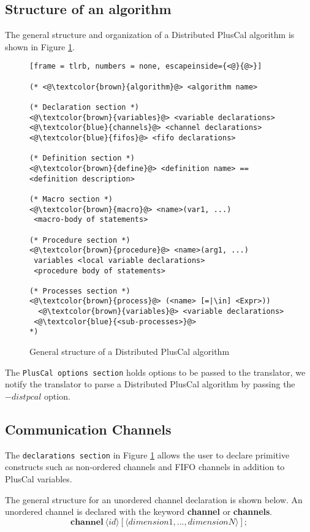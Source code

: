 \documentclass[journal]{IEEEtran}
\newcommand{\keyword}[1]{\textbf{#1}}
\newcommand{\entity}[1]{\ensuremath{\langle}#1\ensuremath{\rangle}}
\begin{document}
\subsection{Structure of an algorithm}

The general structure and organization of a Distributed PlusCal algorithm is shown in Figure \ref{dpluscal-struct}.

\begin{figure}
\begin{lstlisting}[frame = tlrb, numbers = none, escapeinside={<@}{@>}]

(* <@\textcolor{brown}{algorithm}@> <algorithm name>

(* Declaration section *)
<@\textcolor{brown}{variables}@> <variable declarations>
<@\textcolor{blue}{channels}@> <channel declarations>
<@\textcolor{blue}{fifos}@> <fifo declarations>

(* Definition section *)
<@\textcolor{brown}{define}@> <definition name> == <definition description>

(* Macro section *)
<@\textcolor{brown}{macro}@> <name>(var1, ...)
 <macro-body of statements>

(* Procedure section *)
<@\textcolor{brown}{procedure}@> <name>(arg1, ...)
 variables <local variable declarations>
 <procedure body of statements>

(* Processes section *)
<@\textcolor{brown}{process}@> (<name> [=|\in] <Expr>))
  <@\textcolor{brown}{variables}@> <variable declarations>
 <@\textcolor{blue}{<sub-processes>}@>
*)
\end{lstlisting}

\caption{General structure of a Distributed PlusCal algorithm}
\label{dpluscal-struct}
\end{figure}

The \verb|PlusCal options section| holds options to be passed to the translator, we notify the translator to parse a Distributed PlusCal algorithm by passing the $-distpcal$ option.

\subsection{Communication Channels}
The \verb|declarations section| in Figure \ref{dpluscal-struct} allows the user to declare primitive constructs such as non-ordered channels and FIFO channels in addition to PlusCal variables.

The general structure for an unordered channel declaration is shown below. An unordered channel is declared with the keyword \keyword{channel} or \keyword{channels}.
\[
 \keyword{channel}\ \entity{id}[\entity{dimension1,...,dimensionN}];
\]
\end{document}
